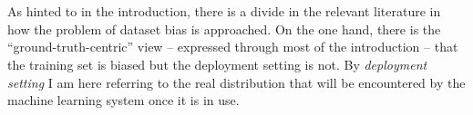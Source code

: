 %
%
%
\section{}\label{two-views-of-the-dataset-bias-problem}
As hinted to in the introduction,
there is a divide in the relevant literature in how the problem of dataset bias is approached.
On the one hand, there is the ``ground-truth-centric'' view -- expressed through most of the introduction --
that the training set is biased but the deployment setting is not.
By \emph{deployment setting} I am here referring to the real distribution
that will be encountered by the machine learning system once it is in use.

